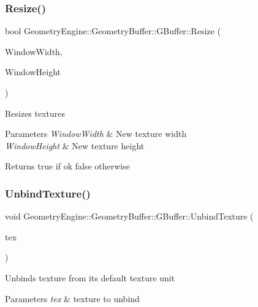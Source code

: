 \subsubsection{\texorpdfstring{Resize()}{Resize()}}
{\footnotesize\ttfamily bool Geometry\+Engine\+::\+Geometry\+Buffer\+::\+G\+Buffer\+::\+Resize (\begin{DoxyParamCaption}\item[{unsigned int}]{Window\+Width,  }\item[{unsigned int}]{Window\+Height }\end{DoxyParamCaption})}

Resizes textures 
\begin{DoxyParams}{Parameters}
{\em Window\+Width} & New texture width \\
\hline
{\em Window\+Height} & New texture height \\
\hline
\end{DoxyParams}
\begin{DoxyReturn}{Returns}
true if ok false otherwise 
\end{DoxyReturn}
\mbox{\label{class_geometry_engine_1_1_geometry_buffer_1_1_g_buffer_a15ffb63e72295abb6a10b2481fb878e4}} 
\subsubsection{\texorpdfstring{UnbindTexture()}{UnbindTexture()}\hspace{0.1cm}{\footnotesize\ttfamily [1/2]}}
{\footnotesize\ttfamily void Geometry\+Engine\+::\+Geometry\+Buffer\+::\+G\+Buffer\+::\+Unbind\+Texture (\begin{DoxyParamCaption}\item[{\mbox{\hyperlink{class_geometry_engine_1_1_geometry_buffer_1_1_g_buffer_a718dceafcac1915f7de061108597e1cc}{G\+B\+U\+F\+F\+E\+R\+\_\+\+T\+E\+X\+T\+U\+R\+E\+\_\+\+T\+Y\+PE}}}]{tex }\end{DoxyParamCaption})}

Unbinds texture from its default texture unit 
\begin{DoxyParams}{Parameters}
{\em tex} & texture to unbind \\
\hline
\end{DoxyParams}
\mbox{\label{class_geometry_engine_1_1_geometry_buffer_1_1_g_buffer_a0bbb50c4eabcee8677a3da316042c44e}} 
